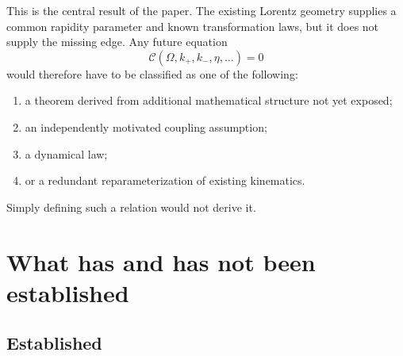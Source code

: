 \documentclass[11pt,a4paper]{article}
\begin{document}
This is the central result of the paper.  The existing Lorentz geometry supplies a common rapidity parameter and known transformation laws, but it does not supply the missing edge.  Any future equation
\begin{equation}
 \mathcal C(\Omega,k_+,k_-,\eta,\ldots)=0
\end{equation}
would therefore have to be classified as one of the following:
\begin{enumerate}[label=(\roman*)]
\item a theorem derived from additional mathematical structure not yet exposed;
\item an independently motivated coupling assumption;
\item a dynamical law;
\item or a redundant reparameterization of existing kinematics.
\end{enumerate}
Simply defining such a relation would not derive it.

\section{What has and has not been established}

\subsection{Established}
\end{document}
